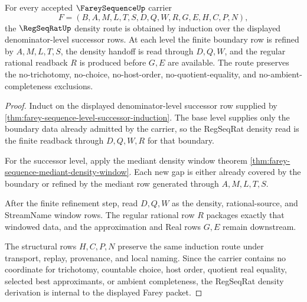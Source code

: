 \begin{theorem}
\label{thm:farey-sequence-regseqrat-density-induction}
For every accepted $\FareySequenceUp$ carrier
$$
F=(B,A,M,L,T,S,D,Q,W,R,G,E,H,C,P,N),
$$
the $\RegSeqRatUp$ density route is obtained by induction over the displayed denominator-level successor rows. At each level the finite boundary row is refined by $A,M,L,T,S$, the density handoff is read through $D,Q,W$, and the regular rational readback $R$ is produced before $G,E$ are available. The route preserves the no-trichotomy, no-choice, no-host-order, no-quotient-equality, and no-ambient-completeness exclusions.
\end{theorem}
\begin{proof}
Induct on the displayed denominator-level successor row supplied by \autoref{thm:farey-sequence-level-successor-induction}. The base level supplies only the boundary data already admitted by the carrier, so the RegSeqRat density read is the finite readback through $D,Q,W,R$ for that boundary.

For the successor level, apply the mediant density window theorem \autoref{thm:farey-sequence-mediant-density-window}. Each new gap is either already covered by the boundary or refined by the mediant row generated through $A,M,L,T,S$.

After the finite refinement step, read $D,Q,W$ as the density, rational-source, and StreamName window rows. The regular rational row $R$ packages exactly that windowed data, and the approximation and Real rows $G,E$ remain downstream.

The structural rows $H,C,P,N$ preserve the same induction route under transport, replay, provenance, and local naming. Since the carrier contains no coordinate for trichotomy, countable choice, host order, quotient real equality, selected best approximants, or ambient completeness, the RegSeqRat density derivation is internal to the displayed Farey packet.
\end{proof}

